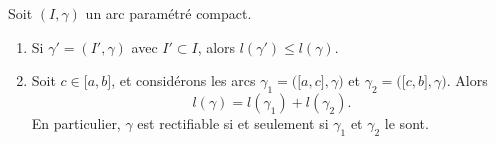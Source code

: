 \begin{proposition}     \label{Propletautredecop}
    Soit $(I,\gamma)$ un arc paramétré compact.
    \begin{enumerate}
        \item
            Si $\gamma'=(I',\gamma)$ avec $I'\subset I$, alors $l(\gamma')\leq l(\gamma)$.
        \item
            Soit $c\in\mathopen[ a , b \mathclose]$, et considérons les arcs $\gamma_1=\big( \mathopen[ a , c \mathclose],\gamma \big)$ et $\gamma_2=\big( \mathopen[ c , b \mathclose],\gamma \big)$. Alors
            \begin{equation}
                l(\gamma)=l(\gamma_1)+l(\gamma_2).
            \end{equation}
            En particulier, $\gamma$ est rectifiable si et seulement si $\gamma_1$ et $\gamma_2$ le sont.
    \end{enumerate}
\end{proposition}

